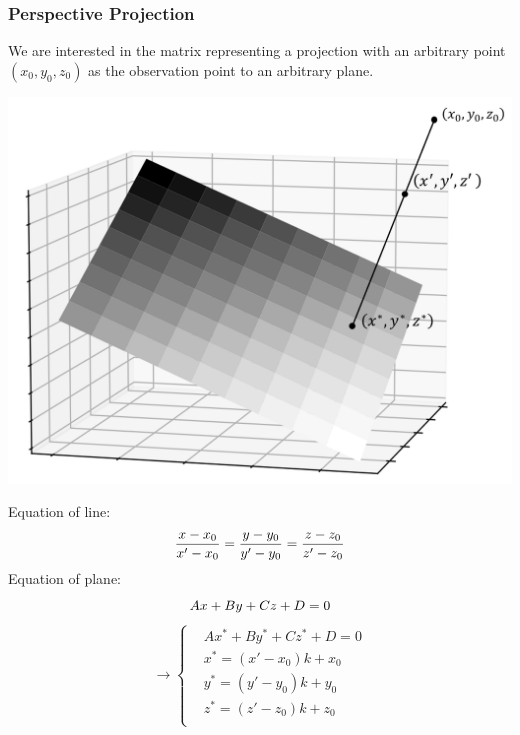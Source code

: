 \documentclass[11pt]{article}
\begin{document}
\subsubsection{Perspective Projection}
We are interested in the matrix representing a projection with an arbitrary point $(x_0,y_0,z_0)$ as the observation point to an arbitrary plane. \par
\begin{minipage}[b]{0.65\linewidth}
\includegraphics[height = 16\baselineskip]{Auxiliary Files/PLT.png}
\end{minipage}
\hfill
\begin{minipage}[b]{0.35\linewidth}
Equation of line:
\begin{equation}
    \frac{x-x_0}{x'-x_0} = \frac{y-y_0}{y'-y_0} = \frac{z-z_0}{z'-z_0} \notag
\end{equation}
Equation of plane:
\begin{equation}
    Ax+By+Cz+D=0 \notag
\end{equation}
\begin{equation}
    \rightarrow \left\{
    \begin{aligned}
        &Ax^* + By^*+Cz^*+D=0\\
        &x^*=(x'-x_0)k+x_0\\
        &y^*=(y'-y_0)k+y_0\\
        &z^*=(z'-z_0)k+z_0\\
    \end{aligned}
    \right.
\end{equation}
\end{minipage}
\par \indent \par
\end{document}
